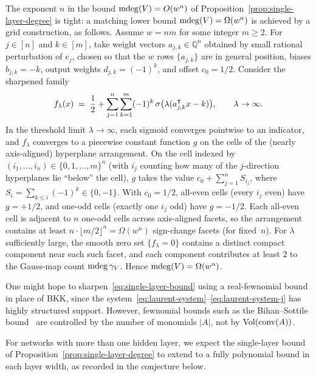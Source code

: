 \begin{remark}\label{rem:single-layer-lowerbound}
  The exponent $n$ in the bound $\operatorname{\mathrm{mdeg}}(V) = O(w^n)$ of Proposition~\ref{prop:single-layer-degree} is tight: a matching lower bound $\operatorname{\mathrm{mdeg}}(V) = \Omega(w^n)$ is achieved by a grid construction, as follows. Assume $w = nm$ for some integer $m\ge 2$. For $j\in [n]$ and $k\in[m]$, take weight vectors $a_{j,k} \in \mathbb{Q}^n$ obtained by small rational perturbation of $e_j$, chosen so that the $w$ rows $\{a_{j,k}\}$ are in general position, biases $b_{j,k} = -k$, output weights $d_{j,k} = (-1)^k$, and offset $c_0 = 1/2$. Consider the sharpened family
  \begin{equation*}
    f_\lambda(x) \;=\; \frac{1}{2} + \sum_{j=1}^n\sum_{k=1}^m (-1)^k\,\sigma\bigl(\lambda(a_{j,k}^{\intercal}x-k)\bigr), \qquad \lambda \to \infty.
  \end{equation*}
  In the threshold limit $\lambda\to\infty$, each sigmoid converges pointwise to an indicator, and $f_\lambda$ converges to a piecewise constant function $g$ on the cells of the (nearly axis-aligned) hyperplane arrangement. On the cell indexed by $(i_1,\ldots,i_n)\in\{0,1,\ldots,m\}^n$ (with $i_j$ counting how many of the $j$-direction hyperplanes lie ``below'' the cell), $g$ takes the value $c_0 + \sum_{j=1}^n S_{i_j}$, where $S_i = \sum_{k\le i}(-1)^k \in\{0,-1\}$.
  With $c_0 = 1/2$, all-even cells (every $i_j$ even) have $g = +1/2$, and one-odd cells (exactly one $i_j$ odd) have $g = -1/2$. Each all-even cell is adjacent to $n$ one-odd cells across axis-aligned facets, so the arrangement contains at least $n\cdot\lfloor m/2\rfloor^n = \Omega(w^n)$ sign-change facets (for fixed~$n$). For $\lambda$ sufficiently large, the smooth zero set $\{f_\lambda = 0\}$ contains a distinct compact component near each such facet, and each component contributes at least $2$ to the Gauss-map count $\operatorname{\mathrm{mdeg}}\gamma_V$. Hence $\operatorname{\mathrm{mdeg}}(V) = \Omega(w^n)$.
\end{remark}


\begin{remark}\label{rem:why-not-fewnomials}
One might hope to sharpen~\eqref{eq:single-layer-bound} using a real-fewnomial bound in place of BKK, since the system~\eqref{eq:laurent-system}--\eqref{eq:laurent-system-j} has highly structured support. However, fewnomial bounds such as the Bihan--Sottile bound~\cite{bihansottile2007} are controlled by the number of monomials $|A|$, not by $\operatorname{Vol}(\operatorname{conv}(A))$.
\end{remark}

For networks with more than one hidden layer, we expect the single-layer bound of Proposition~\ref{prop:single-layer-degree} to extend to a fully polynomial bound in each layer width, as recorded in the conjecture below.

